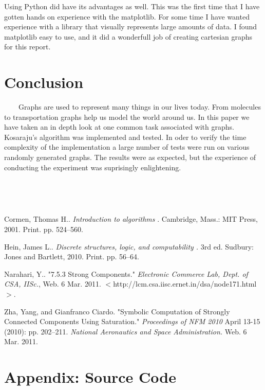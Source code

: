 \documentclass[12pt]{article}
\begin{document}
  Using Python did have its advantages as well. This was the first time that I have gotten hands on experience with the matplotlib. For some time I have wanted experience with a library that visually represents large amounts of data. I found matplotlib easy to use, and it did a wonderfull job of creating cartesian graphs for this report.

\section{Conclusion}

\ \ \ \ Graphs are used to represent many things in our lives today. From molecules to transportation graphs help us model the world around us. In this paper we have taken an in depth look at one common task associated with graphs. Kosaraju's algorithm was implemented and tested. In oder to verify the time complexity of the implementation a large number of tests were run on various randomly generated graphs. The results were as expected, but the experience of conducting the experiment was suprisingly enlightening.

\

\

\begin{thebibliography}{9}


 Cormen, Thomas H.. \emph{Introduction to algorithms } .  Cambridge, Mass.: MIT Press, 2001. Print. pp. 524--560.

Hein, James L.. \emph{Discrete structures, logic, and computability  .} 3rd ed. Sudbury: Jones and Bartlett, 2010. Print. pp. 56--64.

Narahari, Y.. "7.5.3 Strong Components." \emph{Electronic Commerce Lab, Dept. of CSA, IISc.}, Web. 6 Mar. 2011. $<$http://lcm.csa.iisc.ernet.in/dsa/node171.html$>$.

 Zha, Yang, and Gianfranco Ciardo. "Symbolic Computation of Strongly Connected Components Using Saturation." \emph{Proceedings of NFM 2010} April 13-15 (2010): pp. 202--211. \emph{National Aeronautics and Space Administration.} Web. 6 Mar. 2011.

\end{thebibliography}

\newpage

\section*{Appendix: Source Code}
\end{document}
